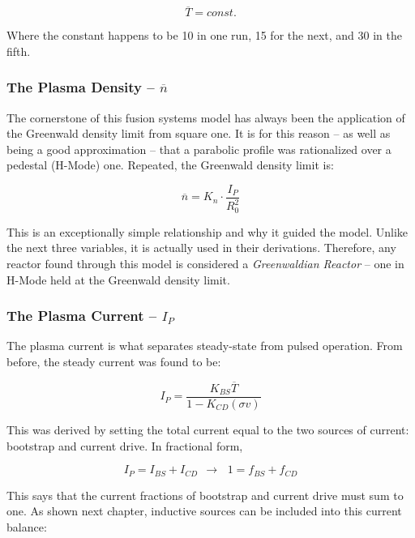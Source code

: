 \begin{equation}
	\label{eq:tbar}
	\overline T = const.
\end{equation}

Where the constant happens to be 10 in one run, 15 for the next, and 30 in the fifth.

\subsubsection{The Plasma Density -- $\overline n$}

The cornerstone of this fusion systems model has always been the application of the Greenwald density limit from square one. It is for this reason -- as well as being a good approximation -- that a parabolic profile was rationalized over a pedestal (H-Mode) one. Repeated, the Greenwald density limit is:

\begin{equation}
	\label{eq:nbar}
	\overline n = K_n \cdot \frac{I_P}{R_0^2}
\end{equation}

This is an exceptionally simple relationship and why it guided the model. Unlike the next three variables, it is actually used in their derivations. Therefore, any reactor found through this model is considered a \emph{Greenwaldian Reactor} -- one in H-Mode held at the Greenwald density limit.

\subsubsection{The Plasma Current -- $I_P$}

The plasma current is what separates steady-state from pulsed operation. From before, the steady current was found to be:

\begin{equation}
	\label{eq:steady}
	I_P = \frac{K_{BS} \overline T}{1 - K_{CD} ( \sigma v ) }
\end{equation}

This was derived by setting the total current equal to the two sources of current: bootstrap and current drive. In fractional form,

\begin{equation}
	I_P = I_{BS} + I_{CD} \ \ \rightarrow \, \ \ 1 = f_{BS} + f_{CD}
\end{equation}

This says that the current fractions of bootstrap and current drive must sum to one. As shown next chapter, inductive sources can be included into this current balance:

